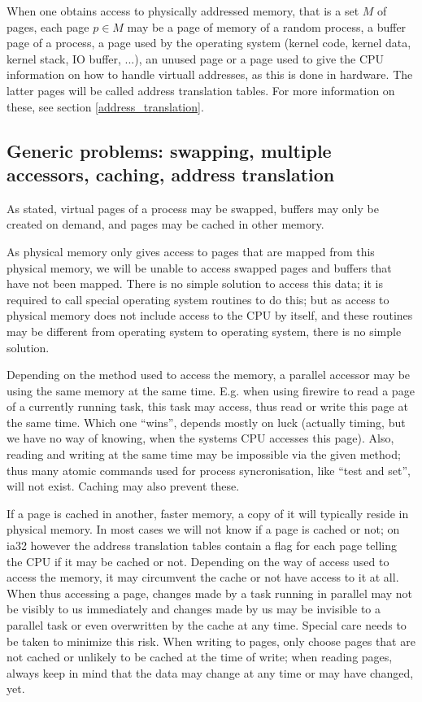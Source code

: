 When one obtains access to physically addressed memory, that is a set $M$ of
pages, each page $p \in M$ may be a page of memory of a random process, a buffer
page of a process, a page used by the operating system (kernel code, kernel
data, kernel stack, IO buffer, ...), an unused page or a page used to give the
CPU information on how to handle virtuall addresses, as this is done in
hardware.  The latter pages will be called address translation tables. For more
information on these, see section \ref{address_translation}.

\subsection{Generic problems: swapping, multiple accessors, caching, address
translation}

As stated, virtual pages of a process may be swapped, buffers may only be
created on demand, and pages may be cached in other memory.

As physical memory only gives access to pages that are mapped from this
physical memory, we will be unable to access swapped pages and buffers that
have not been mapped. There is no simple solution to access this data; it is
required to call special operating system routines to do this; but as access to
physical memory does not include access to the CPU by itself, and these
routines may be different from operating system to operating system, there is
no simple solution.

Depending on the method used to access the memory, a parallel accessor may be
using the same memory at the same time. E.g. when using firewire to read a page
of a currently running task, this task may access, thus read or write this page
at the same time. Which one ``wins'', depends mostly on luck (actually timing,
but we have no way of knowing, when the systems CPU accesses this page). Also,
reading and writing at the same time may be impossible via the given method;
thus many atomic commands used for process syncronisation, like ``test and
set'', will not exist.  Caching may also prevent these.

If a page is cached in another, faster memory, a copy of it will typically
reside in physical memory. In most cases we will not know if a page is cached
or not; on ia32 however the address translation tables contain a flag for each
page telling the CPU if it may be cached or not. Depending on the way of access
used to access the memory, it may circumvent the cache or not have access to it
at all. When thus accessing a page, changes made by a task running in parallel
may not be visibly to us immediately and changes made by us may be invisible to
a parallel task or even overwritten by the cache at any time. Special care
needs to be taken to minimize this risk. When writing to pages, only choose
pages that are not cached or unlikely to be cached at the time of write; when
reading pages, always keep in mind that the data may change at any time or may
have changed, yet.

